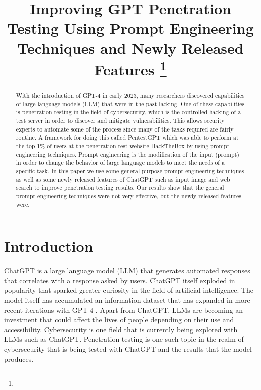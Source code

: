 \documentclass[conference]{IEEEtran}
\begin{document}
\title{Improving GPT Penetration Testing Using Prompt Engineering Techniques and Newly Released Features
\thanks{}
}
\author{
\and
{}
}

\maketitle

\begin{abstract}
    With the introduction of GPT-4 in early 2023, many researchers discovered capabilities of large language models (LLM) that were in the past lacking. One of these capabilities is penetration testing in the field of cybersecurity, which is the controlled hacking of a test server in order to discover and mitigate vulnerabilities. This allows security experts to automate some of the process since many of the tasks required are fairly routine. A framework for doing this called PentestGPT which was able to perform at the top 1\% of users at the penetration test website HackTheBox by using prompt engineering techniques. Prompt engineering is the modification of the input (prompt) in order to change the behavior of large language models to meet the needs of a specific task. In this paper we use some general purpose prompt engineering techniques as well as some newly released features of ChatGPT such as input image and web search to improve penetration testing results. Our results show that the general prompt engineering techniques were not very effective, but the newly released features were.
\end{abstract}

\section{Introduction} \label{sec:intro}
ChatGPT is a large language model (LLM) that generates automated responses that correlates with a response asked by users\cite{engman2023evaluation}. ChatGPT itself exploded in popularity that sparked greater curiosity in the field of artificial intelligence. The model itself has accumulated an information dataset that has expanded in more recent iterations with GPT-4 \cite{hariri2023unlocking}. Apart from ChatGPT, LLMs are becoming an investment that could affect the lives of people depending on their use and accessibility. Cybersecurity is one field that is currently being explored with LLMs such as ChatGPT. Penetration testing is one such topic in the realm of cybersecurity that is being tested with ChatGPT and the results that the model produces.
\end{document}

